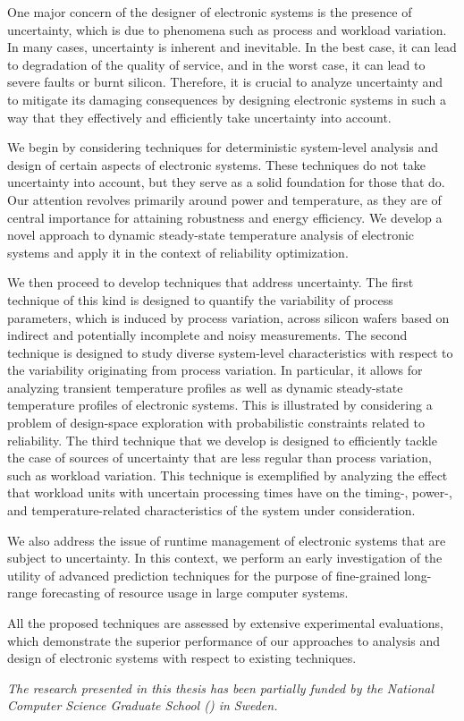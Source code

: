 One major concern of the designer of electronic systems is the presence of
uncertainty, which is due to phenomena such as process and workload variation.
In many cases, uncertainty is inherent and inevitable. In the best case, it can
lead to degradation of the quality of service, and in the worst case, it can
lead to severe faults or burnt silicon. Therefore, it is crucial to analyze
uncertainty and to mitigate its damaging consequences by designing electronic
systems in such a way that they effectively and efficiently take uncertainty
into account.

We begin by considering techniques for deterministic system-level analysis and
design of certain aspects of electronic systems. These techniques do not take
uncertainty into account, but they serve as a solid foundation for those that
do. Our attention revolves primarily around power and temperature, as they are
of central importance for attaining robustness and energy efficiency. We develop
a novel approach to dynamic steady-state temperature analysis of electronic
systems and apply it in the context of reliability optimization.

We then proceed to develop techniques that address uncertainty. The first
technique of this kind is designed to quantify the variability of process
parameters, which is induced by process variation, across silicon wafers based
on indirect and potentially incomplete and noisy measurements. The second
technique is designed to study diverse system-level characteristics with respect
to the variability originating from process variation. In particular, it allows
for analyzing transient temperature profiles as well as dynamic steady-state
temperature profiles of electronic systems. This is illustrated by considering a
problem of design-space exploration with probabilistic constraints related to
reliability. The third technique that we develop is designed to efficiently
tackle the case of sources of uncertainty that are less regular than process
variation, such as workload variation. This technique is exemplified by
analyzing the effect that workload units with uncertain processing times have on
the timing-, power-, and temperature-related characteristics of the system under
consideration.

We also address the issue of runtime management of electronic systems that are
subject to uncertainty. In this context, we perform an early investigation of
the utility of advanced prediction techniques for the purpose of fine-grained
long-range forecasting of resource usage in large computer systems.

All the proposed techniques are assessed by extensive experimental evaluations,
which demonstrate the superior performance of our approaches to analysis and
design of electronic systems with respect to existing techniques.

\vspace{1em}
\noindent
\emph{
  The research presented in this thesis has been partially funded by the
  National Computer Science Graduate School () in Sweden.
}
